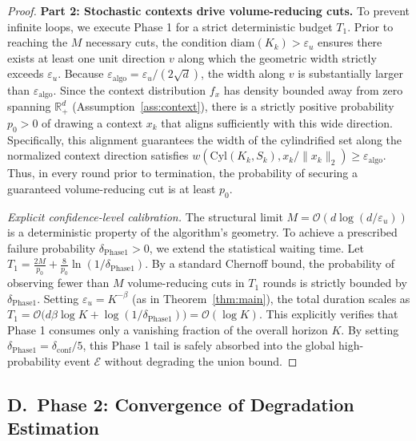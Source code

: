\documentclass[letterpaper, 10 pt, conference]{IEEEconf}
\begin{document}
\begin{proof}
    \textbf{Part 2: Stochastic contexts drive volume-reducing cuts.}
    To prevent infinite loops, we execute Phase 1 for a strict deterministic budget $T_1$. Prior to reaching the $M$ necessary cuts, the condition $\mathrm{diam}(K_k) > \varepsilon_u$ ensures there exists at least one unit direction $v$ along which the geometric width strictly exceeds $\varepsilon_u$. Because $\varepsilon_{\mathrm{algo}} = \varepsilon_u / (2\sqrt{d})$, the width along $v$ is substantially larger than $\varepsilon_{\mathrm{algo}}$. Since the context distribution $f_x$ has density bounded away from zero spanning $\mathbb{R}^d_+$ (Assumption~\ref{ass:context}), there is a strictly positive probability $p_0 > 0$ of drawing a context $x_k$ that aligns sufficiently with this wide direction. Specifically, this alignment guarantees the width of the cylindrified set along the normalized context direction satisfies $w(\mathrm{Cyl}(K_k, S_k), x_k / \|x_k\|_2) \geq \varepsilon_{\mathrm{algo}}$. Thus, in every round prior to termination, the probability of securing a guaranteed volume-reducing cut is at least $p_0$.

    \emph{Explicit confidence-level calibration.}
    The structural limit $M = \mathcal{O}(d\log(d/\varepsilon_u))$ is a deterministic property of the algorithm's geometry. To achieve a prescribed failure probability $\delta_{\mathrm{Phase1}} > 0$, we extend the statistical waiting time. Let $T_1 = \frac{2M}{p_0} + \frac{8}{p_0} \ln(1/\delta_{\mathrm{Phase1}})$. By a standard Chernoff bound, the probability of observing fewer than $M$ volume-reducing cuts in $T_1$ rounds is strictly bounded by $\delta_{\mathrm{Phase1}}$. Setting $\varepsilon_u = K^{-\beta}$ (as in Theorem~\ref{thm:main}), the total duration scales as $T_1 = \mathcal{O}\big(d\beta \log K + \log(1/\delta_{\mathrm{Phase1}})\big) = \mathcal{O}(\log K)$. This explicitly verifies that Phase 1 consumes only a vanishing fraction of the overall horizon $K$. By setting $\delta_{\mathrm{Phase1}} = \delta_{\mathrm{conf}}/5$, this Phase 1 tail is safely absorbed into the global high-probability event $\mathcal{E}$ without degrading the union bound.
\end{proof}


\subsection*{D.~Phase 2: Convergence of Degradation Estimation}
\label{sec:app_phase2}
\end{document}
